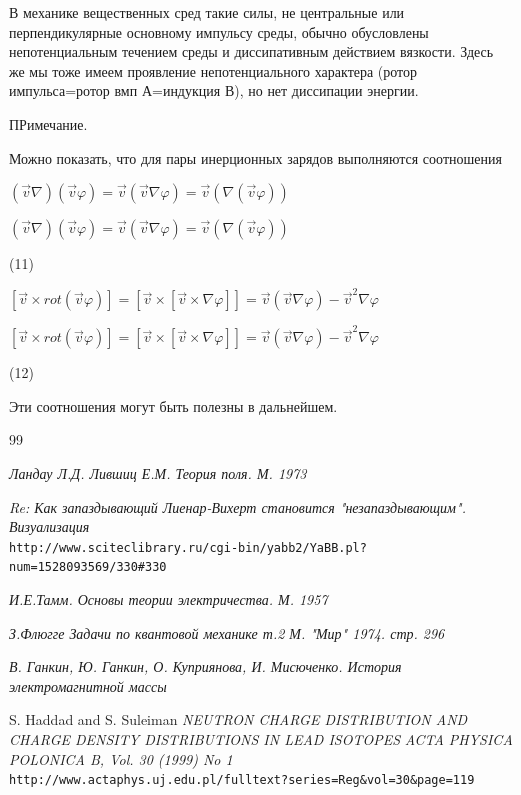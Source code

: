 \documentclass{article}
\begin{document}
В механике вещественных сред такие силы, не центральные или перпендикулярные основному импульсу среды, обычно обусловлены непотенциальным течением среды и диссипативным действием вязкости. Здесь же мы тоже имеем проявление непотенциального характера (ротор импульса=ротор вмп А=индукция В), но нет диссипации энергии.

ПРимечание.

Можно показать, что для пары инерционных зарядов выполняются соотношения

$(\vec v\nabla)(\vec v\varphi)=\vec v(\vec v\nabla\varphi)=\vec v(\nabla(\vec v\varphi))$

$(\vec v\nabla)(\vec v\varphi)=\vec v(\vec v\nabla\varphi)=\vec v(\nabla(\vec v\varphi))$

(11)

$[\vec v\times rot(\vec v\varphi)]=[\vec v\times[\vec v\times\nabla\varphi]]=\vec v(\vec v\nabla\varphi)-\vec v^2\nabla\varphi$

$[\vec v\times rot(\vec v\varphi)]=[\vec v\times[\vec v\times\nabla\varphi]]=\vec v(\vec v\nabla\varphi)-\vec v^2\nabla\varphi$

(12)

Эти соотношения могут быть полезны в дальнейшем.



\begin{thebibliography}{99}

\textit{Ландау Л.Д. Лившиц Е.М. Теория поля. М. 1973}

\textit{Re: Как запаздывающий Лиенар-Вихерт становится "незапаздывающим". Визуализация}
\\\texttt{http://www.sciteclibrary.ru/cgi-bin/yabb2/YaBB.pl?num=1528093569/330\#330}

\textit{И.Е.Тамм. Основы теории электричества. М. 1957}

\textit{З.Флюгге Задачи по квантовой механике т.2 М. "Мир" 1974. стр. 296}

\textit{В. Ганкин, Ю. Ганкин, О. Куприянова, И. Мисюченко. История электромагнитной массы}


S. Haddad and S. Suleiman
\textit{NEUTRON CHARGE DISTRIBUTION AND CHARGE DENSITY DISTRIBUTIONS IN LEAD ISOTOPES}
\textit{ACTA PHYSICA POLONICA B, Vol. 30 (1999) No 1}
\\\texttt{http://www.actaphys.uj.edu.pl/fulltext?series=Reg\&vol=30\&page=119}



\end{thebibliography}
\end{document}
